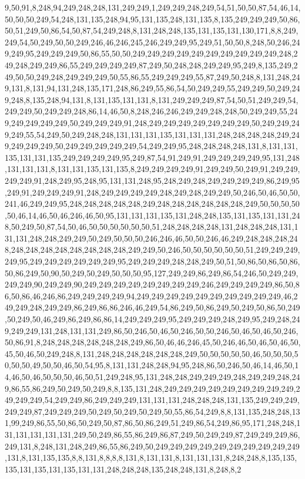 9,50,91,8,248,94,249,248,248,131,249,249,1,249,249,248,249,54,51,50,50,87,54,46,14,50,50,50,249,54,248,131,135,248,94,95,131,135,248,131,135,8,135,249,249,249,50,86,50,51,249,50,86,54,50,87,54,249,248,8,131,248,248,135,131,135,131,130,171,8,8,249,249,54,50,249,50,50,249,246,46,246,245,246,249,249,95,249,51,50,50,8,248,50,246,249,249,95,249,249,249,50,86,55,50,50,249,249,249,249,249,249,249,249,249,249,248,249,248,249,249,86,55,249,249,249,249,87,249,50,248,248,249,249,95,249,8,135,249,249,50,50,249,248,249,249,249,50,55,86,55,249,249,249,55,87,249,50,248,8,131,248,249,131,8,131,94,131,248,135,171,248,86,249,55,86,54,50,249,249,55,249,249,50,249,249,248,8,135,248,94,131,8,131,135,131,131,8,131,249,249,249,87,54,50,51,249,249,54,249,249,50,249,249,248,86,14,46,50,8,248,246,246,249,249,248,248,50,249,249,55,249,249,249,249,249,50,249,249,249,91,248,249,249,249,249,249,249,249,50,249,249,249,249,55,54,249,50,249,248,248,131,131,131,135,131,131,131,248,248,248,248,249,249,249,249,249,50,249,249,249,249,249,54,249,249,95,248,248,248,248,131,8,131,131,135,131,131,135,249,249,249,249,95,249,87,54,91,249,91,249,249,249,249,95,131,248,131,131,131,8,131,131,135,131,135,8,249,249,249,249,91,249,249,50,249,91,249,249,249,249,91,248,249,95,248,95,131,131,248,95,248,249,248,249,249,249,249,86,249,95,249,91,249,249,249,91,248,249,249,249,249,248,249,248,249,249,50,246,50,46,50,50,241,46,249,249,95,248,248,248,248,248,249,248,248,248,248,248,248,249,50,50,50,50,50,46,14,46,50,46,246,46,50,95,131,131,131,135,131,248,248,135,131,135,131,131,248,50,249,50,87,54,50,46,50,50,50,50,50,50,51,248,248,248,248,131,248,248,248,131,131,131,248,248,249,249,50,249,50,50,50,246,246,46,50,50,246,46,249,248,248,248,248,248,248,248,248,248,248,248,248,249,249,50,246,50,50,50,50,50,50,51,249,249,249,249,95,249,249,249,249,249,249,95,249,249,249,248,248,249,50,51,50,86,50,86,50,86,50,86,249,50,90,50,249,50,249,50,50,50,95,127,249,249,86,249,86,54,246,50,249,249,249,249,90,249,249,90,249,249,249,249,249,249,249,249,246,249,249,249,249,86,50,86,50,86,46,246,86,249,249,249,249,94,249,249,249,249,249,249,249,249,249,249,46,249,249,248,249,249,86,249,86,86,246,46,249,54,86,249,50,86,249,50,249,50,86,50,249,50,249,50,46,249,86,249,86,86,14,249,249,249,95,249,249,249,248,249,95,249,248,249,249,249,131,248,131,131,249,86,50,246,50,46,50,246,50,50,246,50,46,50,46,50,246,50,86,91,8,248,248,248,248,248,248,249,86,50,46,46,246,45,50,246,46,50,46,50,46,50,45,50,46,50,249,248,8,131,248,248,248,248,248,248,249,50,50,50,50,50,46,50,50,50,50,50,50,49,50,50,46,50,54,95,8,131,131,248,248,94,95,248,86,50,246,50,46,14,46,50,14,46,50,46,50,50,50,46,50,51,249,248,95,131,248,248,249,249,249,248,249,249,248,249,86,55,86,249,50,249,50,249,8,8,135,131,248,249,249,249,249,249,249,249,249,249,249,249,249,54,249,249,86,249,249,249,131,131,131,248,248,248,131,135,249,249,249,249,249,87,249,249,249,50,249,50,249,50,249,50,55,86,54,249,8,8,131,135,248,248,131,99,249,86,55,50,86,50,249,50,87,86,50,86,249,51,249,86,54,249,86,95,171,248,248,131,131,131,131,131,249,50,249,86,55,86,249,86,87,249,50,249,249,87,249,249,249,86,249,131,8,248,131,248,249,86,55,86,249,50,249,249,249,249,249,249,249,249,249,249,131,8,131,135,135,8,8,131,8,8,8,8,131,8,131,131,8,131,131,131,8,248,248,8,135,135,135,131,135,131,135,131,131,248,248,248,135,248,248,131,8,248,8,2